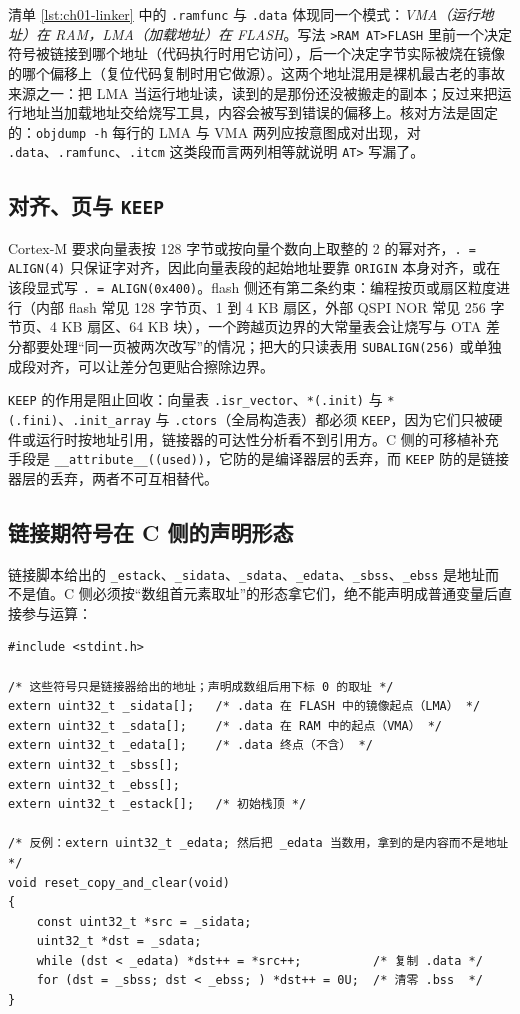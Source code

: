 \documentclass[12pt,a4paper,fontset=fandol]{ctexbook}
\newcommand{\Tp}[1]{\texttt{#1}}
\begin{document}
清单 \ref{lst:ch01-linker} 中的 \Tp{.ramfunc} 与 \Tp{.data} 体现同一个模式：\emph{VMA（运行地址）在 RAM，LMA（加载地址）在 FLASH}。写法 \Tp{>RAM AT>FLASH} 里前一个决定符号被链接到哪个地址（代码执行时用它访问），后一个决定字节实际被烧在镜像的哪个偏移上（复位代码复制时用它做源）。这两个地址混用是裸机最古老的事故来源之一：把 LMA 当运行地址读，读到的是那份还没被搬走的副本；反过来把运行地址当加载地址交给烧写工具，内容会被写到错误的偏移上。核对方法是固定的：\Tp{objdump -h} 每行的 LMA 与 VMA 两列应按意图成对出现，对 \Tp{.data}、\Tp{.ramfunc}、\Tp{.itcm} 这类段而言两列相等就说明 \Tp{AT>} 写漏了。

\subsection{对齐、页与 \Tp{KEEP}}

Cortex-M 要求向量表按 128 字节或按向量个数向上取整的 2 的幂对齐，\Tp{. = ALIGN(4)} 只保证字对齐，因此向量表段的起始地址要靠 \Tp{ORIGIN} 本身对齐，或在该段显式写 \Tp{. = ALIGN(0x400)}。flash 侧还有第二条约束：编程按页或扇区粒度进行（内部 flash 常见 128 字节页、1 到 4 KB 扇区，外部 QSPI NOR 常见 256 字节页、4 KB 扇区、64 KB 块），一个跨越页边界的大常量表会让烧写与 OTA 差分都要处理``同一页被两次改写''的情况；把大的只读表用 \Tp{SUBALIGN(256)} 或单独成段对齐，可以让差分包更贴合擦除边界。

\Tp{KEEP} 的作用是阻止回收：向量表 \Tp{.isr\_vector}、\Tp{*(.init)} 与 \Tp{*(.fini)}、\Tp{.init\_array} 与 \Tp{.ctors}（全局构造表）都必须 \Tp{KEEP}，因为它们只被硬件或运行时按地址引用，链接器的可达性分析看不到引用方。C 侧的可移植补充手段是 \Tp{\_\_attribute\_\_((used))}，它防的是编译器层的丢弃，而 \Tp{KEEP} 防的是链接器层的丢弃，两者不可互相替代。

\subsection{链接期符号在 C 侧的声明形态}

链接脚本给出的 \Tp{\_estack}、\Tp{\_sidata}、\Tp{\_sdata}、\Tp{\_edata}、\Tp{\_sbss}、\Tp{\_ebss} 是地址而不是值。C 侧必须按``数组首元素取址''的形态拿它们，绝不能声明成普通变量后直接参与运算：

\begin{lstlisting}[style=cstyle,caption={链接期符号的正确声明形态：取地址，不要取值},label={lst:ch01-syms}]
#include <stdint.h>

/* 这些符号只是链接器给出的地址；声明成数组后用下标 0 的取址 */
extern uint32_t _sidata[];   /* .data 在 FLASH 中的镜像起点（LMA） */
extern uint32_t _sdata[];    /* .data 在 RAM 中的起点（VMA） */
extern uint32_t _edata[];    /* .data 终点（不含） */
extern uint32_t _sbss[];
extern uint32_t _ebss[];
extern uint32_t _estack[];   /* 初始栈顶 */

/* 反例：extern uint32_t _edata; 然后把 _edata 当数用，拿到的是内容而不是地址 */
void reset_copy_and_clear(void)
{
    const uint32_t *src = _sidata;
    uint32_t *dst = _sdata;
    while (dst < _edata) *dst++ = *src++;          /* 复制 .data */
    for (dst = _sbss; dst < _ebss; ) *dst++ = 0U;  /* 清零 .bss  */
}
\end{lstlisting}
\end{document}
